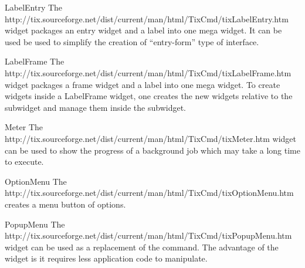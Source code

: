 \begin{classdesc}{LabelEntry}{}
The 
{http://tix.sourceforge.net/dist/current/man/html/TixCmd/tixLabelEntry.htm}
widget packages an entry widget and a label into one mega widget. It
can be used be used to simplify the creation of ``entry-form'' type of
interface.
\end{classdesc}


\begin{classdesc}{LabelFrame}{}
The 
{http://tix.sourceforge.net/dist/current/man/html/TixCmd/tixLabelFrame.htm}
widget packages a frame widget and a label into one mega widget.  To
create widgets inside a LabelFrame widget, one creates the new widgets
relative to the  subwidget and manage them inside the
 subwidget.
\end{classdesc}


\begin{classdesc}{Meter}{}
The 
{http://tix.sourceforge.net/dist/current/man/html/TixCmd/tixMeter.htm}
widget can be used to show the progress of a background job which may
take a long time to execute.
\end{classdesc}


\begin{classdesc}{OptionMenu}{}
The 
{http://tix.sourceforge.net/dist/current/man/html/TixCmd/tixOptionMenu.htm}
creates a menu button of options.
\end{classdesc}


\begin{classdesc}{PopupMenu}{}
The 
{http://tix.sourceforge.net/dist/current/man/html/TixCmd/tixPopupMenu.htm}
widget can be used as a replacement of the 
command. The advantage of the   widget
is it requires less application code to manipulate.
\end{classdesc}

